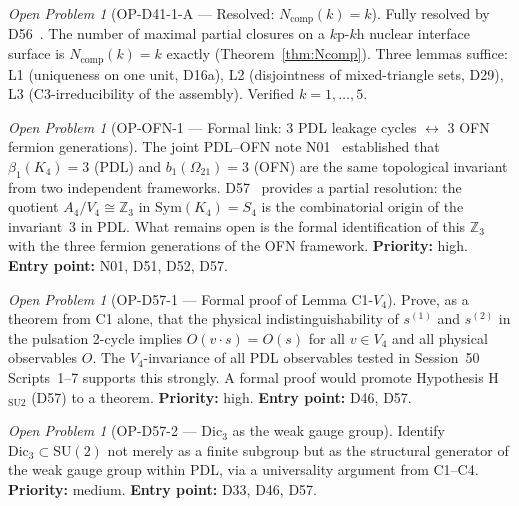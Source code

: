 \documentclass[11pt,a4paper]{article}
\theoremstyle{plain}
\theoremstyle{definition}
\theoremstyle{remark}
\newtheorem{openproblem}[theorem]{Open Problem}
\newcommand{\Kfour}{K_4}
\begin{document}
\begin{openproblem}[OP-D41-1-A --- Resolved: $N_{\mathrm{comp}}(k)=k$]
\label{op:Ncomp}
\textcolor{proofblue}{Fully resolved by D56~\cite{D56}.} The number of maximal partial closures on a $k\mathrm{p}$-$k\mathrm{h}$ nuclear interface surface is $N_{\mathrm{comp}}(k)=k$ exactly (Theorem~\ref{thm:Ncomp}). Three lemmas suffice: L1 (uniqueness on one unit, D16a), L2 (disjointness of mixed-triangle sets, D29), L3 (C3-irreducibility of the assembly). Verified $k=1,\ldots,5$.
\end{openproblem}

\begin{openproblem}[OP-OFN-1 --- Formal link: 3 PDL leakage cycles $\leftrightarrow$ 3 OFN fermion generations]
\label{op:OFN1}
The joint PDL--OFN note N01~\cite{N01} established that $\beta_1(\Kfour)=3$ (PDL) and $b_1(\Omega_{21})=3$ (OFN) are the same topological invariant from two independent frameworks. D57~\cite{D57} provides a partial resolution: the quotient $A_4/V_4 \cong \mathbb{Z}_3$ in $\mathrm{Sym}(\Kfour)=S_4$ is the combinatorial origin of the invariant~3 in PDL. What remains open is the formal identification of this $\mathbb{Z}_3$ with the three fermion generations of the OFN framework. \textbf{Priority:} high. \textbf{Entry point:} N01, D51, D52, D57.
\end{openproblem}

\begin{openproblem}[OP-D57-1 --- Formal proof of Lemma C1-$V_4$]
\label{op:C1V4}
Prove, as a theorem from C1 alone, that the physical indistinguishability of $s^{(1)}$ and $s^{(2)}$ in the pulsation 2-cycle implies $O(v\cdot s) = O(s)$ for all $v \in V_4$ and all physical observables $O$. The $V_4$-invariance of all PDL observables tested in Session~50 Scripts~1--7 supports this strongly. A formal proof would promote Hypothesis H$_{\mathrm{SU2}}$ (D57) to a theorem. \textbf{Priority:} high. \textbf{Entry point:} D46, D57.
\end{openproblem}

\begin{openproblem}[OP-D57-2 --- $\mathrm{Dic}_3$ as the weak gauge group]
\label{op:Dic3}
Identify $\mathrm{Dic}_3 \subset \mathrm{SU}(2)$ not merely as a finite subgroup but as the structural generator of the weak gauge group within PDL, via a universality argument from C1--C4. \textbf{Priority:} medium. \textbf{Entry point:} D33, D46, D57.
\end{openproblem}
\end{document}
